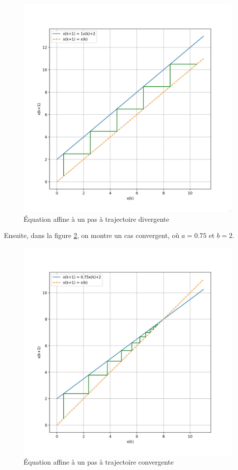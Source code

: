             \begin{figure}[ht!]
                \centering
                \includegraphics[width=\textwidth]{images/affine_1.jpg}
                \caption{Équation affine à un pas à trajectoire divergente}
                \label{fig:affine_1}
            \end{figure}
            Ensuite, dans la figure \ref{fig:affine_2}, on montre un cas convergent, où $a=0.75$ et $b=2$.
            \begin{figure}[ht!]
                \centering
                \includegraphics[width=\textwidth]{images/affine_2.jpg}
                \caption{Équation affine à un pas à trajectoire convergente}
                \label{fig:affine_2}
            \end{figure}

